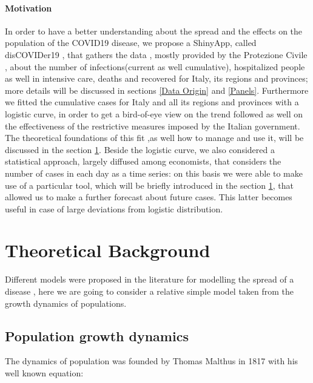 \documentclass[
12pt, %
a4paper, %
oneside, %
headinclude,footinclude, %
BCOR5mm, %
]{scrartcl}
\begin{document}
\paragraph{Motivation} \label{Motivation}
In order to have a better understanding about the spread and the effects on the population of the COVID19 disease, we propose a ShinyApp, called disCOVIDer19 , that gathers  the data , mostly provided by the Protezione Civile \cite{protezionecivile+git}, about the number of infections(current as well cumulative), hospitalized people as well in intensive care, deaths and recovered for Italy, its regions and provinces; more details will be discussed in sections \ref{Data Origin} and \ref{Panels}. Furthermore we fitted the cumulative cases for Italy and all its regions and provinces with a logistic curve, in order to get a bird-of-eye view on the trend followed as well on the effectiveness of the restrictive measures imposed by the Italian government. The theoretical foundations of this fit ,as well how to manage and use it, will be discussed in the section \ref{Theoretical Background}. Beside the logistic curve, we also considered a statistical approach, largely diffused among economists, that considers the number of cases in each day as a time series: on this basis we were able to make use of a particular tool, which will be briefly introduced in the section \ref{Theoretical Background}, that allowed us to  make a further forecast  about future cases.  This latter becomes useful in case of large deviations from logistic distribution. 
 

\section{Theoretical Background} \label{Theoretical Background}
Different models were proposed in the literature for modelling the spread of a disease \cite{keeling2011modeling}, here we are going to consider a relative simple model taken from the growth dynamics of populations.

\subsection{Population growth dynamics}
The dynamics of population was founded by Thomas Malthus in 1817 \cite{malthus1817essay} with his well known equation: 
\end{document}
